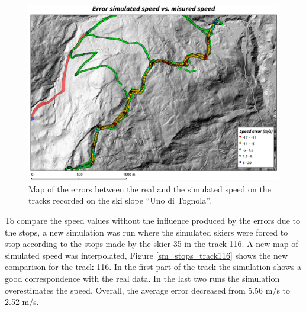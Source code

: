\documentclass[12pt,a4paper,twoside]{book}
\begin{document}
\begin{figure}[!h]
  \centering
    \includegraphics[width=\textwidth]{images/map_error.eps}
    \caption{Map of the errors between the real and the simulated speed on the tracks recorded on the ski slope ``Uno di Tognola''.}\label{map_error}
\end{figure}

To compare the speed values without the influence produced by the errors due to the stops, a new simulation was run where the simulated skiers were forced to stop according to the stops made by the skier 35 in the track 116. A new map of simulated speed was interpolated, Figure \ref{sm_stops_track116} shows the new comparison for the track 116. In the first part of the track the simulation shows a good correspondence with the real data. In the last two runs the simulation overestimates the speed. Overall, the average error decreased from 5.56 m/s to 2.52 m/s.
\end{document}
